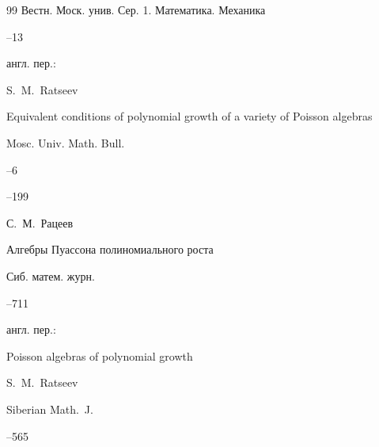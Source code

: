 \begin{thebibliography}{99}
\jour Вестн. Моск. унив. Сер. 1. Математика. Механика




--13




\transl англ. пер.:~




\by S.~M.~Ratseev

\paper Equivalent conditions of polynomial growth of a variety of Poisson algebras

\jour Mosc. Univ. Math. Bull. 


--6

--199 





\by С.~М.~Рацеев

\paper Алгебры Пуассона полиномиального роста

\jour Сиб. матем. журн.




--711




\transl англ. пер.:~

\paper Poisson algebras of polynomial growth

\by S.~M.~Ratseev 

\jour Siberian Math.~J.




--565


\end{thebibliography}

